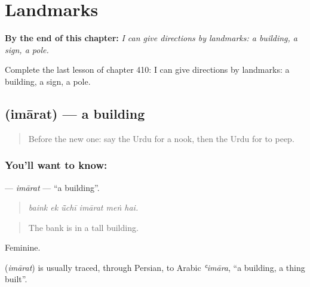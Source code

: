 
\chapter{Landmarks}
\label{ch:ur-landmarks}

\begin{chapteropening}
\textbf{By the end of this chapter:} \emph{I can give directions by landmarks: a building, a sign, a pole.}

Complete the last lesson of chapter 410: I can give directions by landmarks: a building, a sign, a pole.
\end{chapteropening}

\section[\texorpdfstring{\ur{عمارت} (imārat)}{عمارت (imārat)}]{ (imārat) — a building}

\label{lesson:UR-C410-imarat}



\begin{quote}
Before the new one: say the Urdu for a nook, then the Urdu for to peep.
\end{quote}

\subsection*{You'll want to know: }
\textbf{} — \emph{imārat} — \textquotedblleft{}a building\textquotedblright{}.

\begin{quote}
     
\end{quote}

\begin{quote}
\emph{baink ek ū̃chī imārat meṅ hai.}
\end{quote}

\begin{quote}
The bank is in a tall building.
\end{quote}

Feminine.

\begin{cousinweb}
\textbf{} (\emph{imārat}) is usually traced, through Persian, to Arabic \emph{ʿimāra}, \textquotedblleft{}a building, a thing built\textquotedblright{}.
\end{cousinweb}

